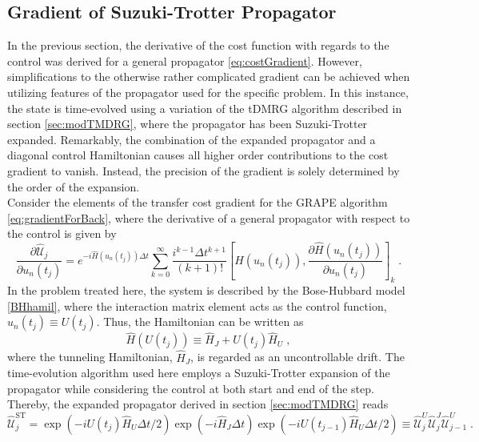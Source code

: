 \subsection{Gradient of Suzuki-Trotter Propagator}
In the previous section, the derivative of the cost function with regards to the control was derived for a general propagator \eqref{eq:costGradient}. However, simplifications to the otherwise rather complicated gradient can be achieved when utilizing features of the propagator used for the specific problem. In this instance, the state is time-evolved using a variation of the tDMRG algorithm described in section \ref{sec:modTMDRG}, where the propagator has been Suzuki-Trotter expanded. Remarkably, the combination of the expanded propagator and a diagonal control Hamiltonian causes all higher order contributions to the cost gradient to vanish. Instead, the precision of the gradient is solely determined by the order of the expansion.\\
Consider the elements of the transfer cost gradient for the GRAPE algorithm \eqref{eq:gradientForBack}, where the derivative of a general propagator with respect to the control is given by
\begin{equation}
	\frac{\partial \hat{\mathcal{U}}_{j}}{\partial u_n (t_j)} = e^{-i \hat{H} (u_n (t_j)) \Delta t}  \sum_{k = 0}^{\infty }  \frac{i^{k-1} \Delta t^{k+1}}{(k+1)!} \left[ \hat{H} (u_n (t_j)) , \frac{\partial \hat{H} (u_n (t_j))}{\partial u_n (t_j)}  \right]_k \;.
\end{equation}
In the problem treated here, the system is described by the Bose-Hubbard model \eqref{BHhamil}, where the interaction matrix element acts as the control function, $u_n (t_j) \equiv U (t_j)$. Thus, the Hamiltonian can be written as 
\begin{equation}
	\hat{H}(U(t_j)) \equiv \hat{H}_J + U(t_j) \hat{H}_U \; ,
\end{equation}
where the tunneling Hamiltonian, $\hat{H}_J$, is regarded as an uncontrollable drift. The time-evolution algorithm used here employs a Suzuki-Trotter expansion of the propagator while considering the control at both start and end of the step. Thereby, the expanded propagator derived in section \ref{sec:modTMDRG} reads
\begin{equation}
	\hat{\mathcal{U}}_{j}^{\mathrm{ST}} = \exp \left( -i U(t_j) \hat{H}_U \Delta t /2 \right) \exp \left( -i \hat{H}_J \Delta t \right) \exp \left( -i  U(t_{j-1}) \hat{H}_U  \Delta t /2 \right)  \equiv \hat{\mathcal{U}}_{j}^{U} \hat{\mathcal{U}}_{j}^{J} \hat{\mathcal{U}}_{j-1}^{U} \; .
\end{equation}

